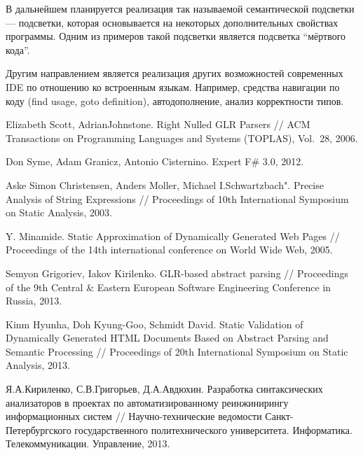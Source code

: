 В дальнейшем планируется реализация так называемой семантической подсветки --- подсветки, которая основывается на некоторых дополнительных свойствах программы. Одним из примеров такой подсветки является подсветка ``мёртвого кода''. 

Другим направлением является реализация других возможностей современных IDE по отношению ко встроенным языкам. Например, средства навигации по коду (find usage, goto definition), автодополнение, анализ корректности типов. 

\begin{thebibliography}{99}
Elizabeth Scott, AdrianJohnstone.
Right Nulled GLR Parsers //
ACM Transactions on Programming Languages and Systems (TOPLAS), Vol.~28, 2006.

Don Syme, Adam Granicz, Antonio Cisternino.
Expert F\# 3.0, 2012.

Aske Simon Christensen, Anders Moller, Michael I.Schwartzbach".
Precise Analysis of String Expressions //
Proceedings of 10th International Symposium on Static Analysis, 2003.

Y. Minamide. Static Approximation of Dynamically Generated Web Pages //
Proceedings of the 14th international conference on World Wide Web, 2005.

Semyon Grigoriev, Iakov Kirilenko. GLR-based abstract parsing //
Proceedings of the 9th Central \& Eastern European Software Engineering Conference in Russia, 2013.

Kinm Hyunha, Doh Kyung-Goo, Schmidt David.
Static Validation of Dynamically Generated HTML Documents Based on Abstract Parsing and Semantic Processing //
Proceedings of 20th International Symposium on Static Analysis, 2013.

Я.А.Кириленко, С.В.Григорьев, Д.А.Авдюхин.
Разработка синтаксических анализаторов в проектах по автоматизированному реинжинирингу информационных систем //
Научно-технические ведомости Санкт-Петербургского государственного политехнического университета. Информатика. Телекоммуникации. Управление, 2013.
\end{thebibliography}
